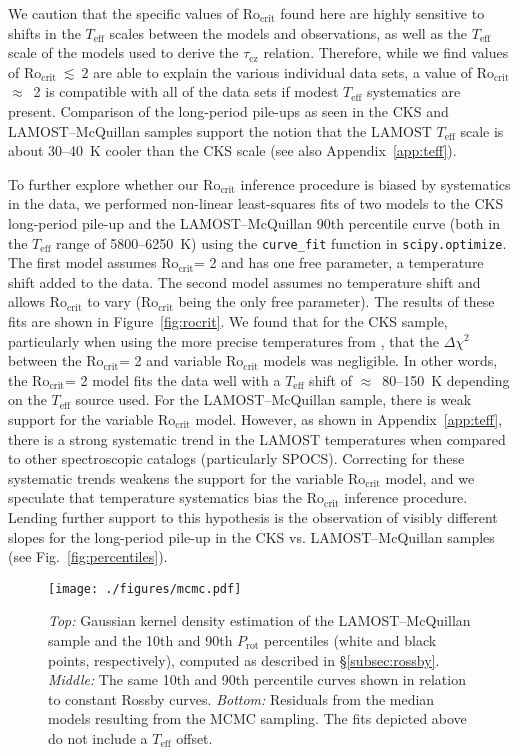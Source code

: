 \documentclass[trackchanges,twocolumn]{aastex631}
\newcommand{\taucz}{$\tau_\mathrm{cz}$\xspace}
\newcommand{\rocrit}{$\mathrm{Ro_{crit}}$\xspace}
\newcommand{\rocritfinal}{$\mathrm{Ro_{crit}}~\lesssim~2$\xspace}
\newcommand{\lamostmcq}{LAMOST--McQuillan\xspace}
\newcommand{\teff}{\ensuremath{T_{\mathrm{eff}}}\xspace}
\newcommand{\prot}{\ensuremath{P_\mathrm{rot}}\xspace}
\begin{document}
We caution that the specific values of \rocrit found here are highly sensitive to shifts in the \teff scales between the models and observations, as well as the \teff scale of the models used to derive the \taucz relation. Therefore, while we find values of \rocritfinal are able to explain the various individual data sets, a value of \rocrit  $\approx$~2 is compatible with all of the data sets if modest \teff systematics are present. Comparison of the long-period pile-ups as seen in the CKS and \lamostmcq samples support the notion that the LAMOST \teff scale is about 30--40~K cooler than the CKS scale (see also Appendix~\ref{app:teff}).

To further explore whether our \rocrit inference procedure is biased by systematics in the data, we performed non-linear least-squares fits of two models to the CKS long-period pile-up and the \lamostmcq 90th percentile curve (both in the \teff range of 5800--6250~K) using the \texttt{curve\_fit} function in \texttt{scipy.optimize}. The first model assumes \rocrit = 2 and has one free parameter, a temperature shift added to the data. The second model assumes no temperature shift and allows \rocrit to vary (\rocrit being the only free parameter). The results of these fits are shown in Figure~\ref{fig:rocrit}. We found that for the CKS sample, particularly when using the more precise temperatures from \citet{Fulton2018}, that the $\Delta \chi^2$ between the \rocrit = 2 and variable \rocrit models was negligible. In other words, the \rocrit = 2 model fits the data well with a \teff shift of $\approx$~80--150~K depending on the \teff source used. For the \lamostmcq sample, there is weak support for the variable \rocrit model. However, as shown in Appendix~\ref{app:teff}, there is a strong systematic trend in the LAMOST temperatures when compared to other spectroscopic catalogs (particularly SPOCS). Correcting for these systematic trends weakens the support for the variable \rocrit model, and we speculate that temperature systematics bias the \rocrit inference procedure. Lending further support to this hypothesis is the observation of visibly different slopes for the long-period pile-up in the CKS vs. \lamostmcq samples (see Fig.~\ref{fig:percentiles}).


\begin{figure}
    \centering
    \texttt{[image: ./figures/mcmc.pdf]}
    \caption{\textit{Top:} Gaussian kernel density estimation of the LAMOST--McQuillan sample and the 10th and 90th \prot percentiles (white and black points, respectively), computed as described in \S\ref{subsec:rossby}. \textit{Middle:} The same 10th and 90th percentile curves shown in relation to constant Rossby curves. \textit{Bottom:} Residuals from the median models resulting from the MCMC sampling. The fits depicted above do not include a \teff offset.}
    \label{fig:mcmc}
\end{figure}
\end{document}
